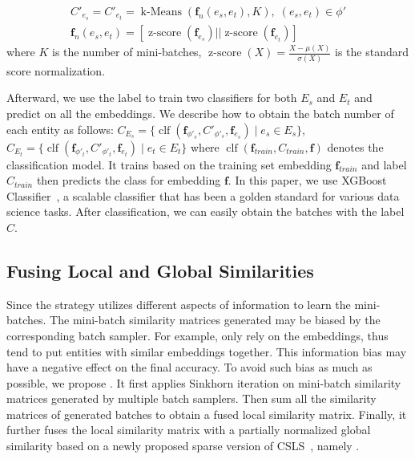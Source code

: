 \begin{equation}
\begin{array}{c}
    C'_{e_s} = C'_{e_t} = \operatorname{k-Means}(\mathbf{f}_{n}(e_s,e_t), K), \; (e_s, e_t) \in \phi'\\
    \mathbf{f}_{n}(e_s,e_t)= [\operatorname{z-score}(\mathbf{f}_{e_s})||\operatorname{z-score}(\mathbf{f}_{e_t})]
\end{array}
\end{equation}
where $K$ is the number of mini-batches,  $\operatorname{z-score}(X)=  \frac{X - \mu(X)}{\sigma(X)}$ is the standard score normalization.

Afterward, we use the label to train two classifiers for both $E_s$ and $E_t$ and predict on all the embeddings. We describe how to obtain the batch number of each entity as follows: $C_{E_s} = \{ \operatorname{clf}(\mathbf{f}_{\phi'_s}, C'_{\phi'_s}, \mathbf{f}_{e_s}) \;|\; e_s \in E_s \}$, $
    C_{E_t} = \{ \operatorname{clf}(\mathbf{f}_{\phi'_t}, C'_{\phi'_t}, \mathbf{f}_{e_t}) \;|\; e_t \in E_t \}$
where $\operatorname{clf}(\mathbf{f}_{train}, C_{train}, \mathbf{f})$ denotes the classification model. It trains based on the training set embedding $\mathbf{f}_{train}$ and label $C_{train}$ then predicts the class for embedding $\mathbf{f}$. In this paper, we use XGBoost Classifier~\cite{XGBoost16}, a scalable classifier that has been a golden standard for various data science tasks. After classification, we can easily obtain the batches with the label $C$.

\subsection{Fusing Local and Global Similarities}

Since the \Sampling{} strategy utilizes different aspects of information to learn the mini-batches. The mini-batch similarity matrices generated may be biased by the corresponding batch sampler. For example, \KMeans{} only rely on the embeddings, thus tend to put entities with similar embeddings together. This information bias may have a negative effect on the final accuracy. To avoid such bias as much as possible, we propose \Merging{}. It first applies Sinkhorn iteration on mini-batch similarity matrices generated by multiple batch samplers. Then sum all the similarity matrices of generated batches to obtain a fused local similarity matrix. Finally, it further fuses the local similarity matrix with a partially normalized global similarity based on a newly proposed sparse version of CSLS~\cite{CSLS}, namely \SparseCSLS{}.


